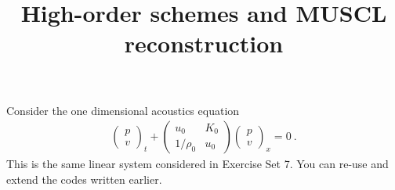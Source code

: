\documentclass[10pt,letterpaper]{article}
\theoremstyle{break}
\begin{document}
\title{High-order schemes and MUSCL reconstruction}
\date{}

\maketitle



Consider the one dimensional acoustics equation
\begin{gather} \label{AcEq}
	\left(
		\begin{array}{c} p \\ v \end{array}
	\right)_{t}
	+
	\left(
		\begin{array}{cc} u_{0} & K_{0} \\ 1 / \rho_{0} & u_{0} \end{array}
	\right) 
	\left(
		\begin{array}{c} p \\ v \end{array}
	\right)_{x}=0\ .
\end{gather}%
This is the same linear system considered in Exercise Set 7. You can re-use and extend the codes written earlier.
\end{document}
